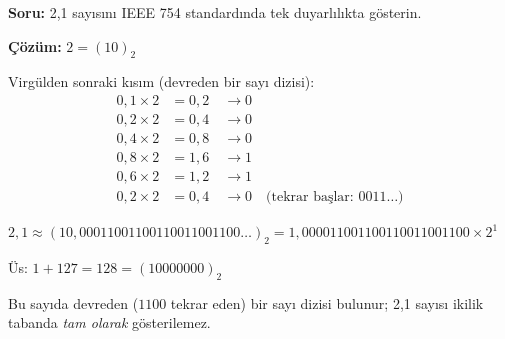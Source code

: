 \begin{ornek}[5.16]
\textbf{Soru:} 2,1 sayısını IEEE 754 standardında tek duyarlılıkta gösterin.

\textbf{Çözüm:} $2 = (10)_2$

Virgülden sonraki kısım (devreden bir sayı dizisi):
\begin{align*}
0{,}1 \times 2 &= 0{,}2 \quad \rightarrow 0 \\
0{,}2 \times 2 &= 0{,}4 \quad \rightarrow 0 \\
0{,}4 \times 2 &= 0{,}8 \quad \rightarrow 0 \\
0{,}8 \times 2 &= 1{,}6 \quad \rightarrow 1 \\
0{,}6 \times 2 &= 1{,}2 \quad \rightarrow 1 \\
0{,}2 \times 2 &= 0{,}4 \quad \rightarrow 0 \quad \text{(tekrar başlar: } 0011\ldots\text{)}
\end{align*}

$2{,}1 \approx (10{,}00011001100110011001100\ldots)_2 = 1{,}000011001100110011001100 \times 2^1$

Üs: $1 + 127 = 128 = (10000000)_2$

\begin{center}
\end{center}

Bu sayıda devreden ($1100$ tekrar eden) bir sayı dizisi bulunur; 2,1 sayısı ikilik tabanda \emph{tam olarak} gösterilemez.
\end{ornek}

